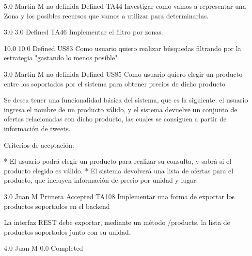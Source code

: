 	{} %
	{5.0} %
	{Martin M} %
	{no definida} %
	{Defined} %
	\task
		{TA44} %
		{Investigar como vamos a representar una Zona y los posibles recursos que vamos a utilizar para determinarlas.} %
		{

} %
		{3.0} %
		{} %
		{3.0} %
		{Defined} %
	\task
		{TA46} %
		{Implementar el filtro por zonas.} %
		{

} %
		{10.0} %
		{} %
		{10.0} %
		{Defined} %
\userStory
	{US83} %
	{Como usuario quiero realizar búsquedas filtrando por la estrategia "gastando lo menos posible"} %
	{

} %
	{} %
	{3.0} %
	{Martin M} %
	{no definida} %
	{Defined} %
\userStory
	{US85} %
	{Como usuario quiero elegir un producto entre los soportados por el sistema para obtener precios de dicho producto} %
	{Se desea tener una funcionalidad básica del sistema, que es la siguiente: el
usuario ingresa el nombre de un producto válido, y el sistema devuelve un
conjunto de ofertas relacionadas con dicho producto, las cuales se consiguen a
partir de información de tweets.

  
Criterios de aceptación:

* El usuario podrá elegir un producto para realizar su consulta, y sabrá si el producto elegido es válido.  
* El sistema devolverá una lista de ofertas para el producto, que incluyen información de precio por unidad y lugar.

} %
	{} %
	{3.0} %
	{Juan M} %
	{Primera} %
	{Accepted} %
	\task
		{TA108} %
		{Implementar una forma de exportar los productos soportados en el backend} %
		{La interfaz REST debe exportar, mediante un método /products, la lista de
productos soportados junto con su unidad.

} %
		{4.0} %
		{Juan M} %
		{0.0} %
		{Completed} %
	\task
